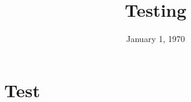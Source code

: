 \documentclass[11pt]{exam}
\title{Testing}
\date{January 1, 1970}
\begin{document}
\maketitle

\section{Test}
\end{document}
